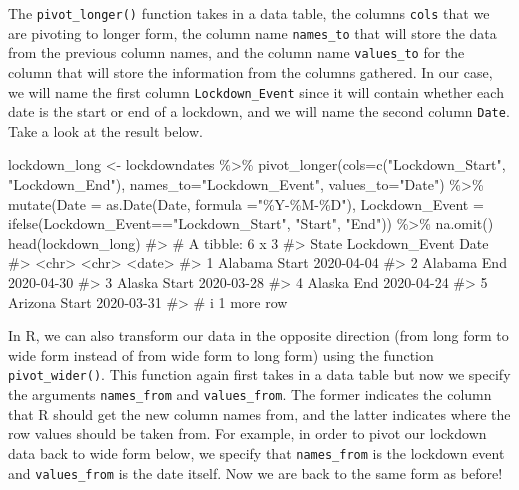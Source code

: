 \documentclass[
  letterpaper,
]{krantz}
\makeatletter
\newenvironment{Shaded}{\begin{snugshade}}{\end{snugshade}}
\newcommand{\AttributeTok}[1]{\textcolor[rgb]{0.40,0.45,0.13}{#1}}
\newcommand{\CommentTok}[1]{\textcolor[rgb]{0.37,0.37,0.37}{#1}}
\newcommand{\FunctionTok}[1]{\textcolor[rgb]{0.28,0.35,0.67}{#1}}
\newcommand{\NormalTok}[1]{\textcolor[rgb]{0.00,0.23,0.31}{#1}}
\newcommand{\OtherTok}[1]{\textcolor[rgb]{0.00,0.23,0.31}{#1}}
\newcommand{\SpecialCharTok}[1]{\textcolor[rgb]{0.37,0.37,0.37}{#1}}
\newcommand{\StringTok}[1]{\textcolor[rgb]{0.13,0.47,0.30}{#1}}
\newenvironment{kframe}{%
\medskip{}
\setlength{\fboxsep}{.8em}
 \def\at@end@of@kframe{}%
 \ifinner\ifhmode%
  \def\at@end@of@kframe{\end{minipage}}%
  \begin{minipage}{\columnwidth}%
 \fi\fi%
 \def\FrameCommand##1{\hskip\@totalleftmargin \hskip-\fboxsep
 \colorbox{shadecolor}{##1}\hskip-\fboxsep
     \hskip-\linewidth \hskip-\@totalleftmargin \hskip\columnwidth}%
 \MakeFramed {\advance\hsize-\width
   \@totalleftmargin\z@ \linewidth\hsize
   \@setminipage}}%
 {\par\unskip\endMakeFramed%
 \at@end@of@kframe}
\renewenvironment{Shaded}{\begin{kframe}}{\end{kframe}}
\makeatother
\begin{document}
The \texttt{pivot\_longer()} function takes in a data table, the columns
\texttt{cols} that we are pivoting to longer form, the column name
\texttt{names\_to} that will store the data from the previous column
names, and the column name \texttt{values\_to} for the column that will
store the information from the columns gathered. In our case, we will
name the first column \texttt{Lockdown\_Event} since it will contain
whether each date is the start or end of a lockdown, and we will name
the second column \texttt{Date}. Take a look at the result below.

\begin{Shaded}
\begin{Highlighting}[]
\NormalTok{lockdown\_long }\OtherTok{\textless{}{-}}\NormalTok{ lockdowndates }\SpecialCharTok{\%\textgreater{}\%}
  \FunctionTok{pivot\_longer}\NormalTok{(}\AttributeTok{cols=}\FunctionTok{c}\NormalTok{(}\StringTok{"Lockdown\_Start"}\NormalTok{, }\StringTok{"Lockdown\_End"}\NormalTok{), }
               \AttributeTok{names\_to=}\StringTok{"Lockdown\_Event"}\NormalTok{, }\AttributeTok{values\_to=}\StringTok{"Date"}\NormalTok{) }\SpecialCharTok{\%\textgreater{}\%}
  \FunctionTok{mutate}\NormalTok{(}\AttributeTok{Date =} \FunctionTok{as.Date}\NormalTok{(Date, }\AttributeTok{formula =}\StringTok{"\%Y{-}\%M{-}\%D"}\NormalTok{), }
         \AttributeTok{Lockdown\_Event =} \FunctionTok{ifelse}\NormalTok{(Lockdown\_Event}\SpecialCharTok{==}\StringTok{"Lockdown\_Start"}\NormalTok{, }
                                 \StringTok{"Start"}\NormalTok{, }\StringTok{"End"}\NormalTok{)) }\SpecialCharTok{\%\textgreater{}\%}
  \FunctionTok{na.omit}\NormalTok{()}
\FunctionTok{head}\NormalTok{(lockdown\_long)}
\CommentTok{\#\textgreater{} \# A tibble: 6 x 3}
\CommentTok{\#\textgreater{}   State   Lockdown\_Event Date      }
\CommentTok{\#\textgreater{}   \textless{}chr\textgreater{}   \textless{}chr\textgreater{}          \textless{}date\textgreater{}    }
\CommentTok{\#\textgreater{} 1 Alabama Start          2020{-}04{-}04}
\CommentTok{\#\textgreater{} 2 Alabama End            2020{-}04{-}30}
\CommentTok{\#\textgreater{} 3 Alaska  Start          2020{-}03{-}28}
\CommentTok{\#\textgreater{} 4 Alaska  End            2020{-}04{-}24}
\CommentTok{\#\textgreater{} 5 Arizona Start          2020{-}03{-}31}
\CommentTok{\#\textgreater{} \# i 1 more row}
\end{Highlighting}
\end{Shaded}

In R, we can also transform our data in the opposite direction (from
long form to wide form instead of from wide form to long form) using the
function \texttt{pivot\_wider()}. This function again first takes in a
data table but now we specify the arguments \texttt{names\_from} and
\texttt{values\_from}. The former indicates the column that R should get
the new column names from, and the latter indicates where the row values
should be taken from. For example, in order to pivot our lockdown data
back to wide form below, we specify that \texttt{names\_from} is the
lockdown event and \texttt{values\_from} is the date itself. Now we are
back to the same form as before!
\end{document}
